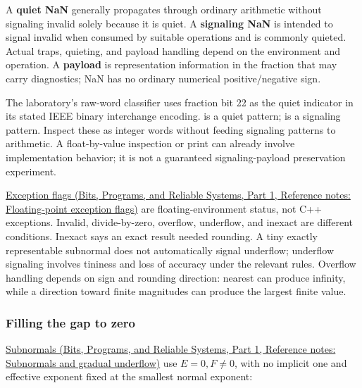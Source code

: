 A \textbf{quiet NaN} generally propagates through ordinary arithmetic without signaling invalid solely because it is quiet. A \textbf{signaling NaN} is intended to signal invalid when consumed by suitable operations and is commonly quieted. Actual traps, quieting, and payload handling depend on the environment and operation. A \textbf{payload} is representation information in the fraction that may carry diagnostics; NaN has no ordinary numerical positive/negative sign.

The laboratory's raw-word classifier uses fraction bit 22 as the quiet indicator in its stated IEEE binary interchange encoding.  is a quiet pattern;  is a signaling pattern. Inspect these as integer words without feeding signaling patterns to arithmetic. A float-by-value inspection or print can already involve implementation behavior; it is not a guaranteed signaling-payload preservation experiment.

\href{../01-Bits-Programs-and-Reliable-Systems-P01/main.pdf\#nameddest=appendix-ed8531b46754}{Exception flags (Bits, Programs, and Reliable Systems, Part 1, Reference notes: Floating-point exception flags)} are floating-environment status, not C++  exceptions. Invalid, divide-by-zero, overflow, underflow, and inexact are different conditions. Inexact says an exact result needed rounding. A tiny exactly representable subnormal does not automatically signal underflow; underflow signaling involves tininess and loss of accuracy under the relevant rules. Overflow handling depends on sign and rounding direction: nearest can produce infinity, while a direction toward finite magnitudes can produce the largest finite value.

\subsubsection{Filling the gap to zero}\label{05-engine-i-ch001-filling-the-gap-to-zero}

\hypertarget{05-engine-i-ch001-filling-the-gap-to-zero}{}

\href{../01-Bits-Programs-and-Reliable-Systems-P01/main.pdf\#nameddest=appendix-00a6e044c437}{Subnormals (Bits, Programs, and Reliable Systems, Part 1, Reference notes: Subnormals and gradual underflow)} use \(E=0,F\ne0\), with no implicit one and effective exponent fixed at the smallest normal exponent:

